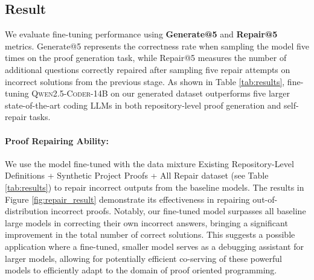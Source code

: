 \subsection{Result}

We evaluate fine-tuning performance using \textbf{Generate@5} and \textbf{Repair@5} metrics. Generate@5 represents the correctness rate when sampling the model five times on the proof generation task, while Repair@5 measures the number of additional questions correctly repaired after sampling five repair attempts on incorrect solutions from the previous stage. As shown in Table \ref{tab:results}, fine-tuning \textsc{Qwen2.5-Coder-14B} on our generated dataset outperforms five larger state-of-the-art coding LLMs in both repository-level proof generation and self-repair tasks.

\paragraph{Proof Repairing Ability:} We use the model fine-tuned with the data mixture Existing Repository-Level Definitions + Synthetic Project Proofs + All Repair dataset (see Table \ref{tab:results}) to repair incorrect outputs from the baseline models. The results in Figure \ref{fig:repair_result} demonstrate its effectiveness in repairing out-of-distribution incorrect proofs. Notably, our fine-tuned model surpasses all baseline large models in correcting their own incorrect answers, bringing a significant improvement in the total number of correct solutions. This suggests a possible application where a fine-tuned, smaller model serves as a debugging assistant for larger models, allowing for potentially efficient co-serving of these powerful models to efficiently adapt to the domain of proof oriented programming.

